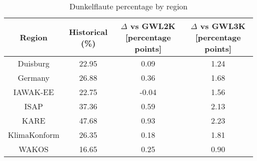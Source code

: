 \begin{table}[!htbp]
\centering
\caption{Dunkelflaute percentage by region}
\label{Table:Dunkelflaute_regions}
\begin{tabular}{cccc}
\hline
Region & Historical (\%) & $\Delta$ vs GWL2K [percentage points] & $\Delta$ vs GWL3K [percentage points] \\
\hline
Duisburg & 22.95 & 0.09 & 1.24\\

Germany & 26.88 & 0.36 & 1.68\\

IAWAK-EE & 22.75 & -0.04 & 1.56\\

ISAP & 37.36 & 0.59 & 2.13\\

KARE & 47.68 & 0.93 & 2.23\\

KlimaKonform & 26.35 & 0.18 & 1.81\\

WAKOS & 16.65 & 0.25 & 0.90\\

\bottomrule
\end{tabular}
\end{table}
